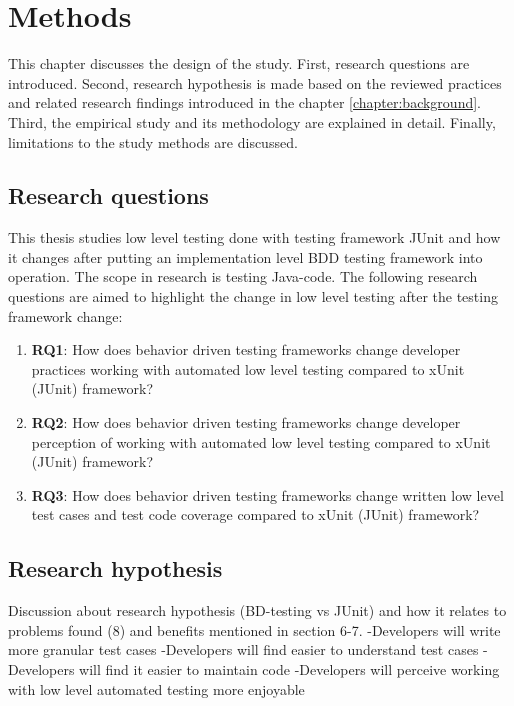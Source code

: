 \chapter{Methods}
\label{chapter:methods}
This chapter discusses the design of the study. First, research questions are introduced.
Second, research hypothesis is made based on the reviewed practices and related research findings introduced in the chapter \ref{chapter:background}.
Third, the empirical study and its methodology are explained in detail. Finally, limitations to the study methods are discussed.

\section{Research questions}
This thesis studies low level testing done with testing framework JUnit and how it changes after putting
an implementation level BDD testing framework into operation. The scope in research is testing Java-code. The following
research questions are aimed to highlight the change in low level testing after the testing framework change:
\begin{enumerate}
\item \textbf{RQ1}: How does behavior driven testing frameworks change developer practices working with automated low level testing compared to xUnit (JUnit) framework?
\item \textbf{RQ2}: How does behavior driven testing frameworks change developer perception of working with automated low level testing compared to xUnit (JUnit) framework?
\item \textbf{RQ3}: How does behavior driven testing frameworks change written low level test cases and test code coverage compared to xUnit (JUnit) framework?
\end{enumerate}

\section{Research hypothesis} %
    Discussion about research hypothesis (BD-testing vs JUnit) and how it relates to problems found (8) and benefits mentioned in section 6-7.\newline
    -Developers will write more granular test cases\newline
    -Developers will find easier to understand test cases\newline
    -Developers will find it easier to maintain code\newline
    -Developers will perceive working with low level automated testing more enjoyable\newline

